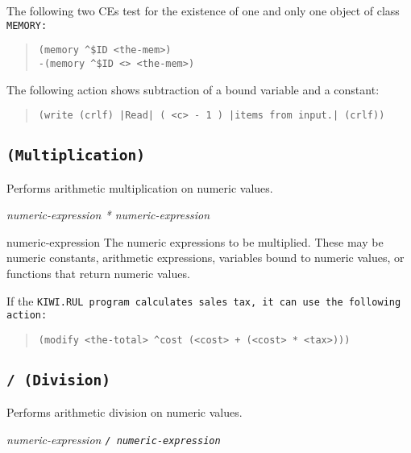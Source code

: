 \Example

The following two CEs test for the existence of one and only one
object of class \tt{MEMORY}:

\begin{quote}
\begin{verbatim}
(memory ^$ID <the-mem>)
-(memory ^$ID <> <the-mem>)
\end{verbatim}
\end{quote}

The following action shows subtraction of a bound variable
and a constant:

\begin{quote}
\begin{verbatim}
(write (crlf) |Read| ( <c> - 1 ) |items from input.| (crlf))
\end{verbatim}
\end{quote}

\subsection{\tt* (Multiplication)}

Performs arithmetic multiplication on numeric values.

\Format
\it{numeric-expression} * \it{numeric-expression}

\begin{operands}
\item[numeric-expression]
  The numeric expressions to be multiplied. These may be numeric
  constants, arithmetic expressions, variables bound to numeric
  values, or functions that return numeric values.
\end{operands}

\Example

If the \tt{KIWI.RUL} program calculates sales tax, it can use the
following action:

\begin{quote}
\begin{verbatim}
(modify <the-total> ^cost (<cost> + (<cost> * <tax>)))
\end{verbatim}
\end{quote}


\subsection{\tt/ (Division)}

Performs arithmetic division on numeric values.

\Format
\it{numeric-expression} \tt/ \it{numeric-expression}

